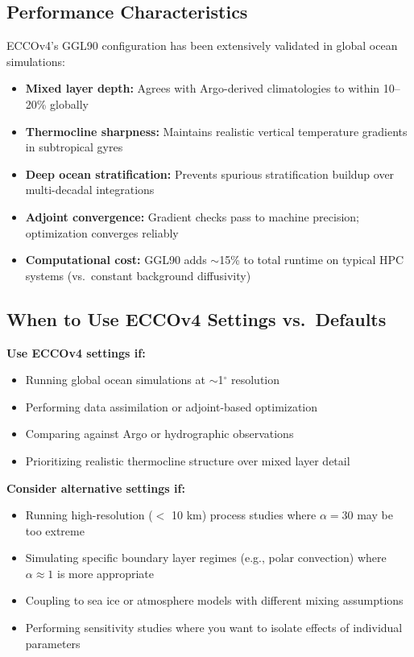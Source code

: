 \documentclass[12pt,letterpaper]{article}
\begin{document}
\subsection{Performance Characteristics}

ECCOv4's GGL90 configuration has been extensively validated in global ocean simulations:

\begin{itemize}[leftmargin=*]
  \item \textbf{Mixed layer depth:} Agrees with Argo-derived climatologies to within 10--20\% globally
  \item \textbf{Thermocline sharpness:} Maintains realistic vertical temperature gradients in subtropical gyres
  \item \textbf{Deep ocean stratification:} Prevents spurious stratification buildup over multi-decadal integrations
  \item \textbf{Adjoint convergence:} Gradient checks pass to machine precision; optimization converges reliably
  \item \textbf{Computational cost:} GGL90 adds $\sim$15\% to total runtime on typical HPC systems (vs.\ constant background diffusivity)
\end{itemize}

\subsection{When to Use ECCOv4 Settings vs.\ Defaults}

\textbf{Use ECCOv4 settings if:}
\begin{itemize}[leftmargin=*]
  \item Running global ocean simulations at $\sim$1$^\circ$ resolution
  \item Performing data assimilation or adjoint-based optimization
  \item Comparing against Argo or hydrographic observations
  \item Prioritizing realistic thermocline structure over mixed layer detail
\end{itemize}

\textbf{Consider alternative settings if:}
\begin{itemize}[leftmargin=*]
  \item Running high-resolution ($<$ 10 km) process studies where $\alpha = 30$ may be too extreme
  \item Simulating specific boundary layer regimes (e.g., polar convection) where $\alpha \approx 1$ is more appropriate
  \item Coupling to sea ice or atmosphere models with different mixing assumptions
  \item Performing sensitivity studies where you want to isolate effects of individual parameters
\end{itemize}
\end{document}
